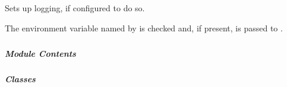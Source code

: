 \documentclass[letterpaper,10pt,english]{sphinxmanual}
\begin{document}
\begin{fulllineitems}
\label{\detokenize{autoapi/pine/client/log/index:pine.client.log.setup_logging}}
Sets up logging, if configured to do so.

The environment variable named by {\hyperref[\detokenize{autoapi/pine/client/log/index:pine.client.log.CONFIG_FILE_ENV}]{}} is checked and, if present, is
passed to .

\end{fulllineitems}



\subparagraph{}
\label{\detokenize{autoapi/pine/client/models/index:module-pine.client.models}}\label{\detokenize{autoapi/pine/client/models/index:pine-client-models}}\label{\detokenize{autoapi/pine/client/models/index::doc}}

\subparagraph{Module Contents}
\label{\detokenize{autoapi/pine/client/models/index:module-contents}}

\subparagraph{Classes}
\label{\detokenize{autoapi/pine/client/models/index:classes}}
\end{document}
